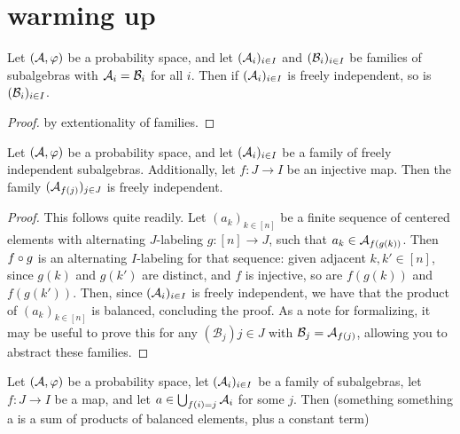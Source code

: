 \chapter{warming up}

\begin{lemma}
  \label{lem:freeIndep_congr}
  Let \((\mathcal{A},\varphi)\) be a probability space, and let \((\mathcal{A}_i)_{i\in I}\) and \((\mathcal{B}_i)_{i\in I}\) be
  families of subalgebras with \(\mathcal{A}_i = \mathcal{B}_i\) for all \(i\). Then if \((\mathcal{A}_i)_{i \in I}\) is freely
  independent, so is \((\mathcal{B}_i)_{i\in I}\).
\end{lemma}
\begin{proof}
  by extentionality of families.
\end{proof}

\begin{lemma}
  \label{lem:freeIndep_of_inj}
  Let \((\mathcal{A},\varphi)\) be a probability space, and let \((\mathcal{A}_i)_{i\in I}\) be a family of
  freely independent subalgebras. Additionally, let \(f:J \rightarrow I\) be an injective map. Then the family
  \((\mathcal{A}_{f(j)})_{j\in J}\) is freely independent.
\end{lemma}
\begin{proof}
  This follows quite readily. Let \((a_k)_{k\in [n]}\) be a finite sequence of centered elements
  with alternating \(J\)-labeling \(g:[n]\rightarrow J\), such that \(a_k \in \mathcal{A}_{f(g(k))}\).
  Then \(f \circ g\) is an alternating \(I\)-labeling for that sequence: given adjacent \(k,k' \in [n]\),
  since \(g(k)\) and \(g(k')\) are distinct, and \(f\) is injective, so are \(f(g(k))\) and \(f(g(k'))\).
  Then, since \((\mathcal{A}_i)_{i\in I}\) is freely independent, we have that the product of \((a_k)_{k\in [n]}\)
  is balanced, concluding the proof. As a note for formalizing, it may be useful to prove this
  for any \((\mathcal{B}_j){j\in J}\) with \(\mathcal{B}_j = \mathcal{A}_{f(j)}\), allowing you to abstract these families.
\end{proof}

\begin{lemma}

\end{lemma}

\begin{lemma}
  \label{lem:mem_iSup_induction_balanced}
  Let \((\mathcal{A},\varphi)\) be a probability space, let \((\mathcal{A}_i)_{i\in I}\) be a family of subalgebras,
  let \(f:J \rightarrow I\) be a map, and let \(a \in \bigcup_{f(i)=j} \mathcal{A}_i\) for some \(j\).
  Then (something something a is a sum of products of balanced elements, plus a constant term)
\end{lemma}



